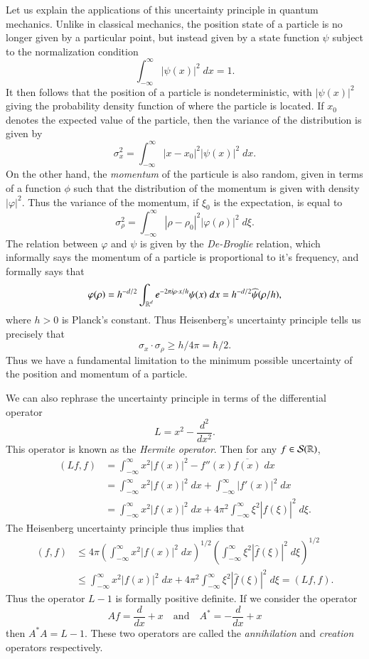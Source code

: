 Let us explain the applications of this uncertainty principle in quantum mechanics. Unlike in classical mechanics, the position state of a particle is no longer given by a particular point, but instead given by a state function $\psi$ subject to the normalization condition
%
\[ \int_{-\infty}^\infty |\psi(x)|^2\; dx = 1. \]
%
It then follows that the position of a particle is nondeterministic, with $|\psi(x)|^2$ giving the probability density function of where the particle is located. If $x_0$ denotes the expected value of the particle, then the variance of the distribution is given by
%
\[ \sigma_x^2 = \int_{-\infty}^\infty |x - x_0|^2 |\psi(x)|^2\; dx. \]
%
On the other hand, the \emph{momentum} of the particule is also random, given in terms of a function $\phi$ such that the distribution of the momentum is given with density $|\varphi|^2$. Thus the variance of the momentum, if $\xi_0$ is the expectation, is equal to
%
\[ \sigma_\rho^2 = \int_{-\infty}^\infty |\rho - \rho_0|^2 |\varphi(\rho)|^2\; d\xi. \]
%
The relation between $\varphi$ and $\psi$ is given by the \emph{De-Broglie} relation, which informally says the momentum of a particle is proportional to it's frequency, and formally says that
%
\[ \varphi(\rho) = h^{-d/2} \int_{\operatorname{\mathbb{R}}^d} e^{- 2 \pi i \rho \cdot x / h} \psi(x)\; dx = h^{-d/2} \widehat{\psi}(\rho / h), \]
%
where $h > 0$ is Planck's constant. Thus Heisenberg's uncertainty principle tells us precisely that
%
\[ \sigma_x \cdot \sigma_\rho \geq h / 4 \pi = \hbar / 2. \]
%
Thus we have a fundamental limitation to the minimum possible uncertainty of the position and momentum of a particle.

We can also rephrase the uncertainty principle in terms of the differential operator
%
\[ L = x^2 - \frac{d^2}{dx^2}. \]
%
This operator is known as the \emph{Hermite operator}. Then for any $f \in \mathcal{S}(\operatorname{\mathbb{R}})$,
%
\begin{align*}
    (Lf,f) &= \int_{-\infty}^\infty x^2 |f(x)|^2 - f''(x) \overline{f(x)}\; dx\\
    &= \int_{-\infty}^\infty x^2 |f(x)|^2\; dx + \int_{-\infty}^\infty |f'(x)|^2\; dx\\
    &= \int_{-\infty}^\infty x^2 |f(x)|^2\; dx + 4 \pi^2 \int_{-\infty}^\infty \xi^2 |\widehat{f}(\xi)|^2\; d\xi.
\end{align*}
%
The Heisenberg uncertainty principle thus implies that
%
\begin{align*}
    (f,f) &\leq 4 \pi \left( \int_{-\infty}^\infty x^2 |f(x)|^2\; dx \right)^{1/2} \left( \int_{-\infty}^\infty \xi^2 |\widehat{f}(\xi)|^2\; d\xi \right)^{1/2}\\
    &\leq \int_{-\infty}^\infty x^2 |f(x)|^2\; dx + 4 \pi^2 \int_{-\infty}^\infty \xi^2 |\widehat{f}(\xi)|^2\; d\xi = (Lf,f).
\end{align*}
%
Thus the operator $L - 1$ is formally positive definite. If we consider the operator
%
\[ Af = \frac{d}{dx} + x \quad\text{and}\quad A^* = - \frac{d}{dx} + x \]
%
then $A^*A = L - 1$. These two operators are called the \emph{annihilation} and \emph{creation} operators respectively.


